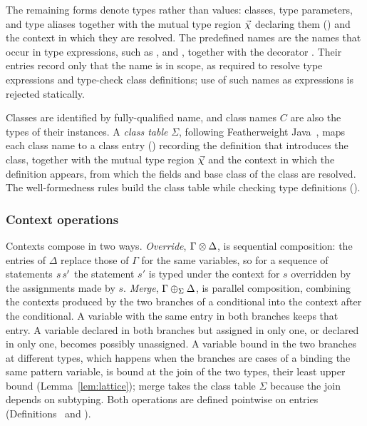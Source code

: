 The remaining forms denote types rather than values: classes, type parameters, and type aliases together
with the mutual type region $\seq{\chi}$ declaring them () and the context in which they are
resolved. The predefined names are the names that occur in type expressions, such as ,  and
, together with the decorator . Their entries record only that the name is
in scope, as required to resolve type expressions and type-check class definitions; use of such names as
expressions is rejected statically.

Classes are identified by fully-qualified name, and class names $C$ are also the types of their instances. A
\emph{class table} $\Sigma$, following Featherweight Java~\citep{igarashi2001}, maps each class name to a class
entry () recording the definition that introduces the class, together with the mutual
type region $\seq{\chi}$ and the context in which the definition appears, from which the fields and base class
of the class are resolved. The well-formedness rules build the class table while checking type definitions
().

\subsubsection{Context operations}
\label{sec:context-operations}

Contexts compose in two ways. \emph{Override}, $\Gamma \override \Delta$, is sequential composition: the entries
of $\Delta$ replace those of $\Gamma$ for the same variables, so for a sequence of statements $\exSeq{s}{s'}$ the statement $s'$ is typed
under the context for $s$ overridden by the assignments made by $s$. \emph{Merge},
$\Gamma \merge_{\Sigma} \Delta$, is parallel composition, combining the contexts produced by the two branches of
a conditional into the context after the conditional. A variable with the same entry in both branches keeps
that entry. A variable declared in both branches but assigned in only one, or declared in only one, becomes
possibly unassigned. A variable bound in the two branches at different types, which happens when the branches
are cases of a  binding the same pattern variable, is bound at the join of the two types, their
least upper bound (Lemma~\ref{lem:lattice}); merge takes the class table $\Sigma$ because the join depends on
subtyping. Both operations are defined pointwise on entries
(Definitions~ and ).

